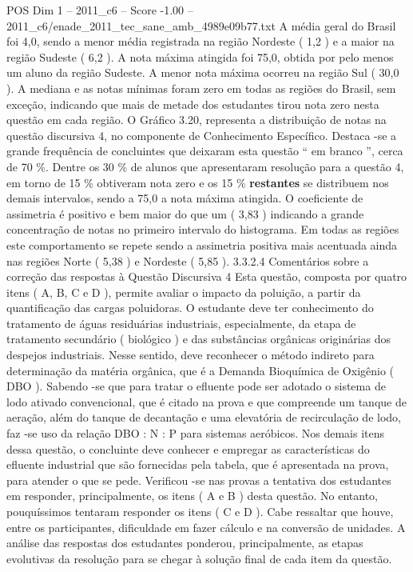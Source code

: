 \begin{textsample}{POS Dim 1 – 2011\_c6 – Score -1.00 – 2011\_c6/enade\_2011\_tec\_sane\_amb\_4989e09b77.txt}
A média geral do Brasil foi 4,0, sendo a menor média registrada na região Nordeste ( 1,2 ) e a maior na região Sudeste ( 6,2 ).
A nota máxima atingida foi 75,0, obtida por pelo menos um aluno da região Sudeste.
A menor nota máxima ocorreu na região Sul ( 30,0 ).
A mediana e as notas mínimas foram zero em todas as regiões do Brasil, sem exceção, indicando que mais de metade dos estudantes tirou nota zero nesta questão em cada região.
O Gráfico 3.20, representa a distribuição de notas na questão discursiva 4, no componente de Conhecimento Específico.
Destaca -se a grande frequência de concluintes que deixaram esta questão “ em branco ”, cerca de 70 \%.
Dentre os 30 \% de alunos que apresentaram resolução para a questão 4, em torno de 15 \% obtiveram nota zero e os 15 \% \textbf{restantes} se distribuem nos demais intervalos, sendo a 75,0 a nota máxima atingida.
O coeficiente de assimetria é positivo e bem maior do que um ( 3,83 ) indicando a grande concentração de notas no primeiro intervalo do histograma.
Em todas as regiões este comportamento se repete sendo a assimetria positiva mais acentuada ainda nas regiões Norte ( 5,38 ) e Nordeste ( 5,85 ). 3.3.2.4 Comentários sobre a correção das respostas à Questão Discursiva 4 Esta questão, composta por quatro itens ( A, B, C e D ), permite avaliar o impacto da poluição, a partir da quantificação das cargas poluidoras.
O estudante deve ter conhecimento do tratamento de águas residuárias industriais, especialmente, da etapa de tratamento secundário ( biológico ) e das substâncias orgânicas originárias dos despejos industriais.
Nesse sentido, deve reconhecer o método indireto para determinação da matéria orgânica, que é a Demanda Bioquímica de Oxigênio ( DBO ).
Sabendo -se que para tratar o efluente pode ser adotado o sistema de lodo ativado convencional, que é citado na prova e que compreende um tanque de aeração, além do tanque de decantação e uma elevatória de recirculação de lodo, faz -se uso da relação DBO : N : P para sistemas aeróbicos.
Nos demais itens dessa questão, o concluinte deve conhecer e empregar as características do efluente industrial que são fornecidas pela tabela, que é apresentada na prova, para atender o que se pede.
Verificou -se nas provas a tentativa dos estudantes em responder, principalmente, os itens ( A e B ) desta questão.
No entanto, pouquíssimos tentaram responder os itens ( C e D ).
Cabe ressaltar que houve, entre os participantes, dificuldade em fazer cálculo e na conversão de unidades.
A análise das respostas dos estudantes ponderou, principalmente, as etapas evolutivas da resolução para se chegar à solução final de cada item da questão.

\end{textsample}
